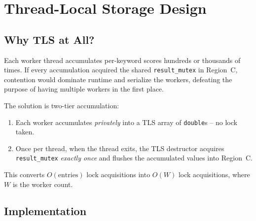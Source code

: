 \documentclass[11pt,a4paper]{article}
\newcommand{\code}[1]{\texttt{\small #1}}
\begin{document}
\section{Thread-Local Storage Design}

\subsection{Why TLS at All?}

Each worker thread accumulates per-keyword scores hundreds or thousands
of times. If every accumulation acquired the shared \code{result\_mutex}
in Region~C, contention would dominate runtime and serialize the
workers, defeating the purpose of having multiple workers in the first
place.

The solution is two-tier accumulation:

\begin{enumerate}
    \item Each worker accumulates \emph{privately} into a TLS array of
        \code{double}s -- no lock taken.
    \item Once per thread, when the thread exits, the TLS destructor
        acquires \code{result\_mutex} \emph{exactly once} and flushes
        the accumulated values into Region~C.
\end{enumerate}

This converts $O(\text{entries})$ lock acquisitions into $O(W)$ lock
acquisitions, where $W$ is the worker count.

\subsection{Implementation}
\end{document}
